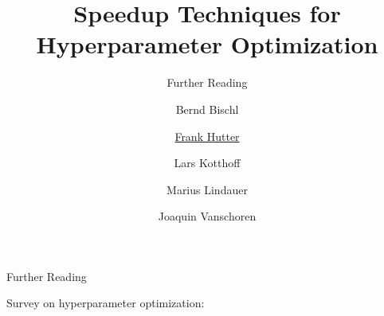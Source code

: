 

\title{Speedup Techniques for Hyperparameter Optimization}
\subtitle{Further Reading}
\author[Frank Hutter]{Bernd Bischl \and \underline{Frank Hutter} \and Lars Kotthoff\newline \and Marius Lindauer \and Joaquin Vanschoren}
\institute{}
\date{}




\maketitle


\begin{frame}[c]{Further Reading}

Survey on hyperparameter optimization:     

\end{frame}
